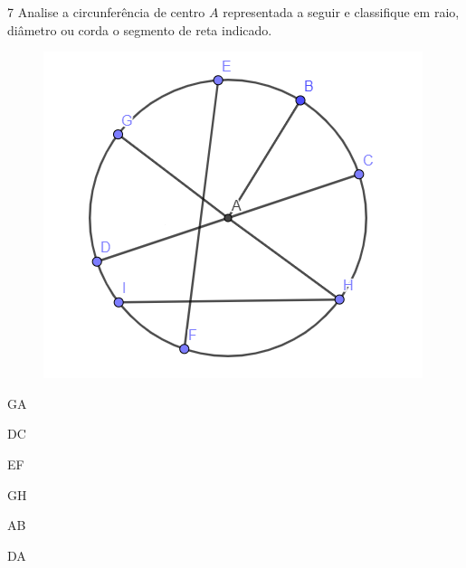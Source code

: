 {{{






\num{7} Analise a circunferência de centro $A$ representada a seguir e
classifique em raio, diâmetro ou corda o segmento de reta indicado.

\begin{figure}[H]
\centering\includegraphics[width=\textwidth]{./imgSAEB_8_MAT/media/image12.png}
\end{figure}

\begin{escolha}
\item GA

\item DC

\item EF

\item GH

\item AB

\item DA


\end{escolha}}}}
